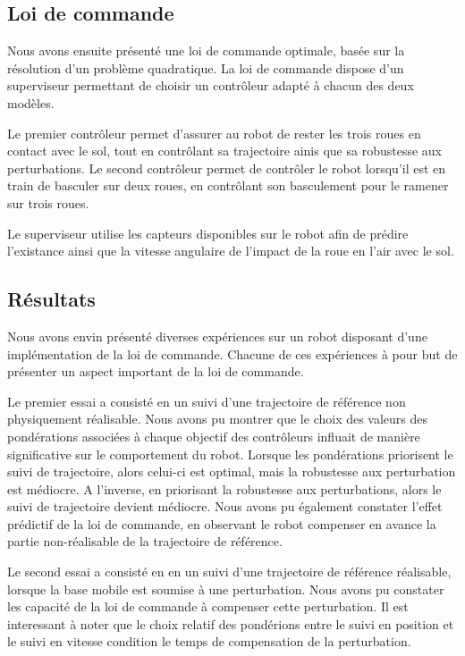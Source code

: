	\subsection{Loi de commande}
	
	  Nous avons ensuite présenté une loi de commande optimale, basée sur la résolution d'un problème quadratique.
	  La loi de commande dispose d'un superviseur permettant de choisir un contrôleur adapté à chacun des deux modèles.
	  
	  Le premier contrôleur permet d'assurer au robot de rester les trois roues en contact avec le sol, tout en contrôlant sa trajectoire ainis que sa robustesse aux perturbations.
	  Le second contrôleur permet de contrôler le robot lorsqu'il est en train de basculer sur deux roues, en contrôlant son basculement pour le ramener sur trois roues.
	  
	  Le superviseur utilise les capteurs disponibles sur le robot afin de prédire l'existance ainsi que la vitesse angulaire de l'impact de la roue en l'air avec le sol.

	\subsection{Résultats}
	
	  Nous avons envin présenté diverses expériences sur un robot disposant d'une implémentation de la loi de commande. 
	  Chacune de ces expériences à pour but de présenter un aspect important de la loi de commande.
	  
	  Le premier essai a consisté en un suivi d'une trajectoire de référence non physiquement réalisable.
	  Nous avons pu montrer que le choix des valeurs des pondérations associées à chaque objectif des contrôleurs influait de manière significative sur le comportement du robot.
	  Lorsque les pondérations priorisent le suivi de trajectoire, alors celui-ci est optimal, mais la robustesse aux perturbation est médiocre.
	  A l'inverse, en priorisant la robustesse aux perturbations, alors le suivi de trajectoire devient médiocre.
	  Nous avons pu également constater l'effet prédictif de la loi de commande, en observant le robot compenser en avance la partie non-réalisable de la trajectoire de référence.
	  
	  Le second essai a consisté en en un suivi d'une trajectoire de référence réalisable, lorsque la base mobile est soumise à une perturbation.
	  Nous avons pu constater les capacité de la loi de commande à compenser cette perturbation.
	  Il est interessant à noter que le choix relatif des pondérions entre le suivi en position et le suivi en vitesse condition le temps de compensation de la perturbation.
	  
